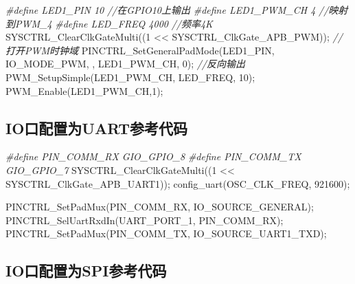 \documentclass[
  12pt,
]{book}
\newenvironment{Shaded}{\begin{snugshade}}{\end{snugshade}}
\newcommand{\CommentTok}[1]{\textcolor[rgb]{0.56,0.35,0.01}{\textit{#1}}}
\newcommand{\DecValTok}[1]{\textcolor[rgb]{0.00,0.00,0.81}{#1}}
\newcommand{\NormalTok}[1]{#1}
\newcommand{\PreprocessorTok}[1]{\textcolor[rgb]{0.56,0.35,0.01}{\textit{#1}}}
\begin{document}
\begin{Shaded}
\begin{Highlighting}[]
  \PreprocessorTok{#define LED1_PIN 10 }\CommentTok{//在GPIO10上输出}
  \PreprocessorTok{#define LED1_PWM_CH 4 }\CommentTok{//映射到PWM_4}
  \PreprocessorTok{#define  LED_FREQ     4000 }\CommentTok{//频率4K}
\NormalTok{  SYSCTRL_ClearClkGateMulti((}\DecValTok{1}\NormalTok{ << SYSCTRL_ClkGate_APB_PWM));  }\CommentTok{//打开PWM时钟域}
\NormalTok{  PINCTRL_SetGeneralPadMode(LED1_PIN, IO_MODE_PWM, , LED1_PWM_CH, }\DecValTok{0}\NormalTok{); }\CommentTok{//反向输出}
\NormalTok{  PWM_SetupSimple(LED1_PWM_CH, LED_FREQ, }\DecValTok{10}\NormalTok{);}
\NormalTok{  PWM_Enable(LED1_PWM_CH,}\DecValTok{1}\NormalTok{);}
\end{Highlighting}
\end{Shaded}

\hypertarget{ioux53e3ux914dux7f6eux4e3auartux53c2ux8003ux4ee3ux7801}{%
\subsection{IO口配置为UART参考代码}\label{ioux53e3ux914dux7f6eux4e3auartux53c2ux8003ux4ee3ux7801}}

\begin{Shaded}
\begin{Highlighting}[]
  \PreprocessorTok{#define PIN_COMM_RX GIO_GPIO_8}
  \PreprocessorTok{#define PIN_COMM_TX GIO_GPIO_7}
\NormalTok{  SYSCTRL_ClearClkGateMulti((}\DecValTok{1}\NormalTok{ << SYSCTRL_ClkGate_APB_UART1));}
\NormalTok{  config_uart(OSC_CLK_FREQ, }\DecValTok{921600}\NormalTok{);}

\NormalTok{  PINCTRL_SetPadMux(PIN_COMM_RX, IO_SOURCE_GENERAL);}
\NormalTok{  PINCTRL_SelUartRxdIn(UART_PORT_1, PIN_COMM_RX);}
\NormalTok{  PINCTRL_SetPadMux(PIN_COMM_TX, IO_SOURCE_UART1_TXD);}
\end{Highlighting}
\end{Shaded}

\hypertarget{ioux53e3ux914dux7f6eux4e3aspiux53c2ux8003ux4ee3ux7801}{%
\subsection{IO口配置为SPI参考代码}\label{ioux53e3ux914dux7f6eux4e3aspiux53c2ux8003ux4ee3ux7801}}
\end{document}
